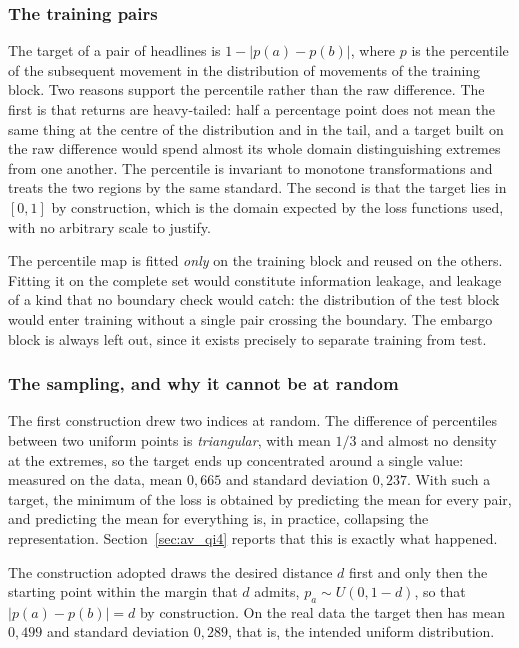 \subsubsection*{The training pairs}

The target of a pair of headlines is $1 - |p(a) - p(b)|$, where $p$ is the percentile of the
subsequent movement in the distribution of movements of the training block. Two reasons support
the percentile rather than the raw difference. The first is that returns are heavy-tailed: half a
percentage point does not mean the same thing at the centre of the distribution and in the tail,
and a target built on the raw difference would spend almost its whole domain distinguishing
extremes from one another. The percentile is invariant to monotone transformations and treats the
two regions by the same standard. The second is that the target lies in $[0, 1]$ by construction,
which is the domain expected by the loss functions used, with no arbitrary scale to justify.

The percentile map is fitted \emph{only} on the training block and reused on the others. Fitting
it on the complete set would constitute information leakage, and leakage of a kind that no
boundary check would catch: the distribution of the test block would enter training without a
single pair crossing the boundary. The embargo block is always left out, since it exists
precisely to separate training from test.

\subsubsection*{The sampling, and why it cannot be at random}

The first construction drew two indices at random. The difference of percentiles between two
uniform points is \emph{triangular}, with mean $1/3$ and almost no density at the extremes, so
the target ends up concentrated around a single value: measured on the data, mean $0{,}665$ and
standard deviation $0{,}237$. With such a target, the minimum of the loss is obtained by
predicting the mean for every pair, and predicting the mean for everything is, in practice,
collapsing the representation. Section~\ref{sec:av_qi4} reports that this is exactly what
happened.

The construction adopted draws the desired distance $d$ first and only then the starting point
within the margin that $d$ admits, $p_a \sim U(0, 1-d)$, so that $|p(a) - p(b)| = d$ by
construction. On the real data the target then has mean $0{,}499$ and standard deviation
$0{,}289$, that is, the intended uniform distribution.

